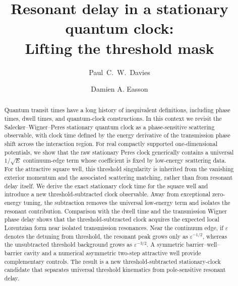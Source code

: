 \documentclass[aps,pra,preprint,notitlepage,nofootinbib]{revtex4-2}
\begin{document}

\title{Resonant delay in a stationary quantum clock:\\
Lifting the threshold mask}



\author{Paul~C.~W.~Davies} 

\author{Damien A. Easson}




\begin{abstract}
Quantum transit times have a long history of inequivalent definitions, including
phase times, dwell times, and quantum-clock constructions.  In this context we
revisit the Salecker--Wigner--Peres stationary quantum clock as a phase-sensitive
scattering observable, with clock time defined by the energy derivative of the
transmission phase shift across the interaction region.  For real compactly
supported one-dimensional potentials, we show that the raw stationary Peres
clock generically contains a universal \(1/\sqrt{E}\) continuum-edge term whose
coefficient is fixed by low-energy scattering data.  For the attractive square
well, this threshold singularity is inherited from the vanishing exterior
momentum and the associated scattering matching, rather than from resonant
delay itself.
We derive the exact stationary clock time for the square well and introduce a
new threshold-subtracted clock observable.  Away from exceptional zero-energy
tuning, the subtraction removes the universal low-energy term and isolates the
resonant contribution.  Comparison with the dwell time and the transmission
Wigner phase delay shows that the threshold-subtracted clock acquires the
expected local Lorentzian form near isolated transmission resonances.  Near the
continuum edge, if \(\varepsilon\) denotes the detuning from threshold, the
resonant peak grows only as \(\varepsilon^{-1/2}\), whereas the unsubtracted
threshold background grows as \(\varepsilon^{-3/2}\).  A symmetric
barrier--well--barrier cavity and a numerical asymmetric two-step attractive
well provide complementary controls.  The result is a new threshold-subtracted
stationary-clock candidate that separates universal threshold kinematics from
pole-sensitive resonant delay.
\end{abstract}
\end{document}

